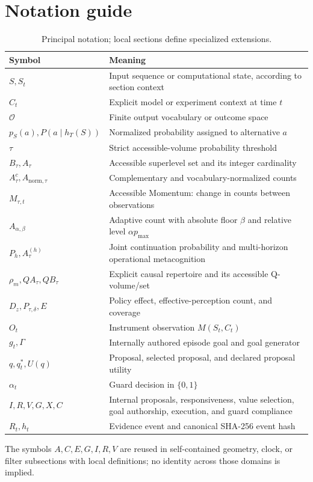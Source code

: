\section{Notation guide}
\label{app:notation}
\begin{table}[htbp]
\centering
\caption{Principal notation; local sections define specialized extensions.}
\label{tab:notation}
{\small
\begin{tabularx}{\textwidth}{p{3.0cm}X}
\toprule
Symbol&Meaning\\
\midrule
$S,S_t$&Input sequence or computational state, according to section context\\
$C_t$&Explicit model or experiment context at time $t$\\
$\mathcal O$&Finite output vocabulary or outcome space\\
$p_S(a),P(a\mid h_T(S))$&Normalized probability assigned to alternative $a$\\
$\tau$&Strict accessible-volume probability threshold\\
$B_\tau,A_\tau$&Accessible superlevel set and its integer cardinality\\
$A_\tau^c,A_{\mathrm{norm},\tau}$&Complementary and vocabulary-normalized counts\\
$M_{\tau,t}$&Accessible Momentum: change in counts between observations\\
$A_{\alpha,\beta}$&Adaptive count with absolute floor $\beta$ and relative level $\alpha p_{\max}$\\
$P_h,A_\tau^{(h)}$&Joint continuation probability and multi-horizon operational metacognition\\
$\rho_m,QA_\tau,QB_\tau$&Explicit causal repertoire and its accessible Q-volume/set\\
$D_z,P_{\tau,\delta},E$&Policy effect, effective-perception count, and coverage\\
$O_t$&Instrument observation $M(S_t,C_t)$\\
$g_t,\Gamma$&Internally authored episode goal and goal generator\\
$q,q_t^*,U(q)$&Proposal, selected proposal, and declared proposal utility\\
$\alpha_t$&Guard decision in $\{0,1\}$\\
$I,R,V,G,X,C$&Internal proposals, responsiveness, value selection, goal authorship, execution, and guard compliance\\
$R_t,h_t$&Evidence event and canonical SHA-256 event hash\\
\bottomrule
\end{tabularx}}
\end{table}
The symbols $A,C,E,G,I,R,V$ are reused in self-contained geometry, clock, or filter subsections with local definitions; no identity across those domains is implied.


